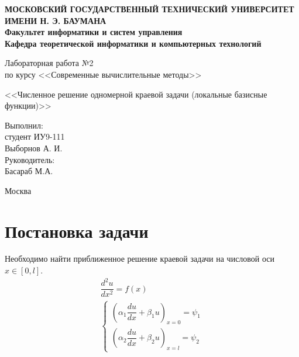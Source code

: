 \documentclass[12pt,a4paper,oneside]{extarticle}
\begin{document}
\pgfplotsset{compat=1.8}

\thispagestyle{empty}
\newpage
{
\centering


\textbf{
МОСКОВСКИЙ ГОСУДАРСТВЕННЫЙ ТЕХНИЧЕСКИЙ УНИВЕРСИТЕТ ИМЕНИ Н. Э. БАУМАНА \\
Факультет информатики и систем управления \\
Кафедра теоретической информатики и компьютерных технологий}
\bigskip
\bigskip
\bigskip
\bigskip
\bigskip
\bigskip
\bigskip

\vfill


Лабораторная работа №2 \\
по курсу <<Современные вычислительные методы>>

\bigskip

{\large <<Численное решение одномерной краевой задачи (локальные базисные функции)>>}
\bigskip

\vfill



\hfill\parbox{4cm} {
Выполнил:\\
студент ИУ9-111 \hfill \\
Выборнов А. И.\hfill \medskip\\
Руководитель:\\
Басараб М.А.\hfill
}


\vspace{\fill}

Москва \number\year
\clearpage
}

\clearpage



\section{Постановка задачи}
    Необходимо найти приближенное решение краевой задачи на числовой оси $x \in [0, l]$.
    \begin{gather}
        \dfrac{d^2u}{dx^2} = f(x) \nonumber \\
        \begin{cases}
            \left( \alpha_1 \dfrac{du}{dx} + \beta_1 u \right)_{x=0} = \psi_1 \nonumber \\
            \left( \alpha_2 \dfrac{du}{dx} + \beta_2 u \right)_{x=l} = \psi_2 \nonumber
        \end{cases}
    \end{gather}
    
\end{document}
